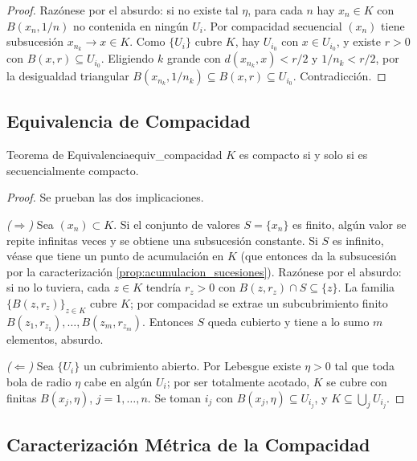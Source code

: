 \documentclass[11pt, a4paper]{article}
\begin{document}
\begin{proof}
Razónese por el absurdo: si no existe tal $\eta$, para cada $n$ hay $x_n \in K$ con $B(x_n, 1/n)$ no contenida
en ningún $U_i$. Por compacidad secuencial $(x_n)$ tiene subsucesión $x_{n_k} \to x \in K$. Como
$\{U_i\}$ cubre $K$, hay $U_{i_0}$ con $x \in U_{i_0}$, y existe $r > 0$ con
$B(x, r) \subseteq U_{i_0}$. Eligiendo $k$ grande con $d(x_{n_k}, x) < r/2$ y $1/n_k < r/2$, por la
desigualdad triangular $B(x_{n_k}, 1/n_k) \subseteq B(x, r) \subseteq U_{i_0}$. Contradicción.
\end{proof}

\subsection{Equivalencia de Compacidad}

\begin{teorema}{Teorema de Equivalencia}{equiv_compacidad}
$K$ es compacto si y solo si es secuencialmente compacto.
\end{teorema}

\begin{proof}
Se prueban las dos implicaciones.

\textit{($\Rightarrow$)} Sea $(x_n) \subset K$.
Si el conjunto de valores $S = \{x_n\}$ es finito, algún valor se repite infinitas veces
y se obtiene una subsucesión constante.
Si $S$ es infinito, véase que tiene un punto de acumulación en $K$
(que entonces da la subsucesión por la caracterización \ref{prop:acumulacion_sucesiones}).
Razónese por el absurdo: si no lo tuviera, cada $z \in K$ tendría $r_z > 0$ con
$B(z, r_z) \cap S \subseteq \{z\}$.
La familia $\{B(z, r_z)\}_{z \in K}$ cubre $K$; por compacidad se extrae un
subcubrimiento finito $B(z_1, r_{z_1}), \dots, B(z_m, r_{z_m})$.
Entonces $S$ queda cubierto y tiene a lo sumo $m$ elementos, absurdo.

\textit{($\Leftarrow$)} Sea $\{U_i\}$ un cubrimiento abierto.
Por Lebesgue existe $\eta > 0$ tal que toda bola de radio $\eta$ cabe en algún $U_i$;
por ser totalmente acotado, $K$ se cubre con finitas $B(x_j, \eta)$, $j = 1, \dots, n$.
Se toman $i_j$ con $B(x_j, \eta) \subseteq U_{i_j}$, y $K \subseteq \bigcup_j U_{i_j}$.
\end{proof}

\subsection{Caracterización Métrica de la Compacidad}
\end{document}
